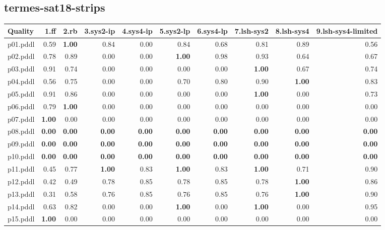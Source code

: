\documentclass{article}
\begin{document}
\hypertarget{quality-termes-sat18-strips}{}
\subsection*{termes-sat18-strips}

\begin{tabular}{@{}lrrrrrrrrr@{}}
Quality & 1.ff & 2.rb & 3.sys2-ip & 4.sys4-ip & 5.sys2-lp & 6.sys4-lp & 7.lsh-sys2 & 8.lsh-sys4 & 9.lsh-sys4-limited \\
\midrule
p01.pddl & 0.59 & \textbf{1.00} & 0.84 & 0.00 & 0.84 & 0.68 & 0.81 & 0.89 & 0.56 \\
p02.pddl & 0.78 & 0.89 & 0.00 & 0.00 & \textbf{1.00} & 0.98 & 0.93 & 0.64 & 0.67 \\
p03.pddl & 0.91 & 0.74 & 0.00 & 0.00 & 0.00 & 0.00 & \textbf{1.00} & 0.67 & 0.74 \\
p04.pddl & 0.56 & 0.75 & 0.00 & 0.00 & 0.70 & 0.80 & 0.90 & \textbf{1.00} & 0.83 \\
p05.pddl & 0.91 & 0.86 & 0.00 & 0.00 & 0.00 & 0.00 & \textbf{1.00} & 0.00 & 0.73 \\
p06.pddl & 0.79 & \textbf{1.00} & 0.00 & 0.00 & 0.00 & 0.00 & 0.00 & 0.00 & 0.00 \\
p07.pddl & \textbf{1.00} & 0.00 & 0.00 & 0.00 & 0.00 & 0.00 & 0.00 & 0.00 & 0.00 \\
p08.pddl & \textbf{0.00} & \textbf{0.00} & \textbf{0.00} & \textbf{0.00} & \textbf{0.00} & \textbf{0.00} & \textbf{0.00} & \textbf{0.00} & \textbf{0.00} \\
p09.pddl & \textbf{0.00} & \textbf{0.00} & \textbf{0.00} & \textbf{0.00} & \textbf{0.00} & \textbf{0.00} & \textbf{0.00} & \textbf{0.00} & \textbf{0.00} \\
p10.pddl & \textbf{0.00} & \textbf{0.00} & \textbf{0.00} & \textbf{0.00} & \textbf{0.00} & \textbf{0.00} & \textbf{0.00} & \textbf{0.00} & \textbf{0.00} \\
p11.pddl & 0.45 & 0.77 & \textbf{1.00} & 0.83 & \textbf{1.00} & 0.83 & \textbf{1.00} & 0.71 & 0.90 \\
p12.pddl & 0.42 & 0.49 & 0.78 & 0.85 & 0.78 & 0.85 & 0.78 & \textbf{1.00} & 0.86 \\
p13.pddl & 0.31 & 0.58 & 0.76 & 0.85 & 0.76 & 0.85 & 0.76 & \textbf{1.00} & 0.90 \\
p14.pddl & 0.63 & 0.82 & 0.00 & 0.00 & \textbf{1.00} & 0.00 & \textbf{1.00} & 0.00 & 0.95 \\
p15.pddl & \textbf{1.00} & 0.00 & 0.00 & 0.00 & 0.00 & 0.00 & 0.00 & 0.00 & 0.00 \\

\end{tabular}
\end{document}
